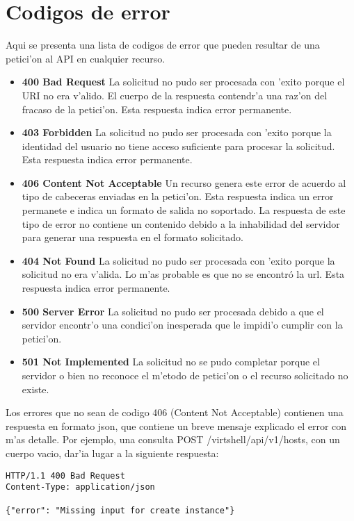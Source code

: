 \section{Codigos de error}
Aqui se presenta una lista de codigos de error que pueden resultar de una petici'on al API en cualquier recurso.

\begin{itemize}
\item \textbf{400 Bad Request} La solicitud no pudo ser procesada con 'exito porque el URI no era v'alido. El cuerpo de la respuesta contendr'a una raz'on del fracaso de la petici'on. Esta respuesta indica error permanente.

\item \textbf{403 Forbidden} La solicitud no pudo ser procesada con 'exito porque la identidad del usuario no tiene acceso suficiente para procesar la solicitud. Esta respuesta indica error permanente.

\item \textbf{406 Content Not Acceptable} Un recurso genera este error de acuerdo al tipo de cabeceras enviadas en la petici'on. Esta respuesta indica un error permanete e indica un formato de salida no soportado. La respuesta de este tipo de error no contiene un contenido debido a la inhabilidad del servidor para generar una respuesta en el formato solicitado.

\item \textbf{404 Not Found} La solicitud no pudo ser procesada con 'exito porque la solicitud no era v'alida. Lo m'as probable es que no se encontró la url. Esta respuesta indica error permanente.

\item \textbf{500 Server Error} La solicitud no pudo ser procesada debido a que el servidor encontr'o una condici'on inesperada que le impidi'o cumplir con la petici'on.

\item \textbf{501 Not Implemented} La solicitud no se pudo completar porque el servidor o bien no reconoce el m'etodo de petici'on o el recurso solicitado no existe.

\end{itemize}

Los errores que no sean de codigo 406 (Content Not Acceptable) contienen una respuesta en formato json, que contiene un breve mensaje explicado el error con m'as detalle. Por ejemplo, una consulta POST /virtshell/api/v1/hosts, con un cuerpo vacio, dar'ia lugar a la siguiente respuesta:

\vspace{1cm}
\begin{lstlisting}[style=json]
HTTP/1.1 400 Bad Request
Content-Type: application/json

{"error": "Missing input for create instance"}
\end{lstlisting}